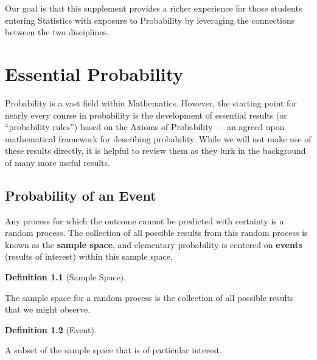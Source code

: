 \documentclass[
  letterpaper,
  DIV=11,
  numbers=noendperiod]{scrreprt}
\theoremstyle{definition}
\newtheorem{definition}{Definition}[chapter]
\theoremstyle{plain}
\theoremstyle{definition}
\theoremstyle{remark}
\begin{document}
Our goal is that this supplement provides a richer experience for those
students entering Statistics with exposure to Probability by leveraging
the connections between the two disciplines.


\chapter{Essential Probability}\label{sec-fundamentals}

\providecommand{\norm}[1]{\left\lVert#1\right\rVert}
\providecommand{\abs}[1]{\left\lvert#1\right\rvert}
\providecommand{\dist}[1]{\stackrel{\text{#1}}{\sim}}
\providecommand{\ind}[1]{\mathbb{I}\left(#1\right)}
\providecommand{\bm}[1]{\mathbf{#1}}
\providecommand{\bs}[1]{\boldsymbol{#1}}
\providecommand{\Ell}{\mathcal{L}}
\providecommand{\indep}{\perp\negthickspace\negmedspace\perp}

Probability is a vast field within Mathematics. However, the starting
point for nearly every course in probability is the development of
essential results (or ``probability rules'') based on the Axioms of
Probability --- an agreed upon mathematical framework for describing
probability. While we will not make use of these results directly, it is
helpful to review them as they lurk in the background of many more
useful results.

\section{Probability of an Event}\label{probability-of-an-event}

Any process for which the outcome cannot be predicted with certainty is
a random process. The collection of all possible results from this
random process is known as the \textbf{sample space}, and elementary
probability is centered on \textbf{events} (results of interest) within
this sample space.

\begin{definition}[Sample
Space]\protect\hypertarget{def-sample-space}{}\label{def-sample-space}

The sample space for a random process is the collection of all possible
results that we might observe.

\end{definition}

\begin{definition}[Event]\protect\hypertarget{def-event}{}\label{def-event}

A subset of the sample space that is of particular interest.

\end{definition}
\end{document}
